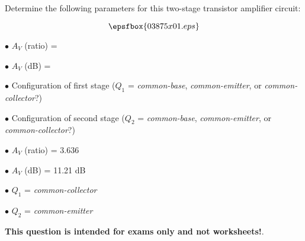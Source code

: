 

Determine the following parameters for this two-stage transistor amplifier circuit:

$$\epsfbox{03875x01.eps}$$

\medskip
\item{$\bullet$} $A_V$ (ratio) = 
\item{$\bullet$} $A_V$ (dB) = 
\item{$\bullet$} Configuration of first stage ($Q_1$ = {\it common-base}, {\it common-emitter}, or {\it common-collector}?)
\item{$\bullet$} Configuration of second stage ($Q_2$ = {\it common-base}, {\it common-emitter}, or {\it common-collector}?)
\medskip







\medskip
\item{$\bullet$} $A_V$ (ratio) = 3.636
\item{$\bullet$} $A_V$ (dB) = 11.21 dB
\item{$\bullet$} $Q_1$ = {\it common-collector}
\item{$\bullet$} $Q_2$ = {\it common-emitter}
\medskip







{\bf This question is intended for exams only and not worksheets!}.




